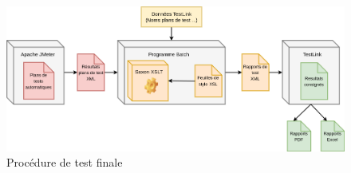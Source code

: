 \begin{figure}[h!]
	\includegraphics[scale=0.5]{images/travailNeuflizeOBC/testsFonc/testsProcedure.png}
	\centering
	\caption{Procédure de test finale}
	\label{testsProcedure}
\end{figure}
